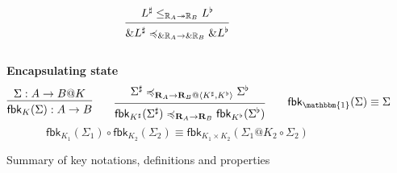 \documentclass[acmsmall,screen,review,anonymous]{acmart}
\newcommand{\kw}[1]{\ensuremath{ \mathsf{#1} }}
\renewcommand{\preceq}{\preccurlyeq}
\begin{document}
\begin{figure}
\[\begin{prooftree}
      \hypo{L^\sharp
        \le_{\mathbb{R}_A \twoheadrightarrow \mathbb{R}_B}
        L^\flat}
      \infer1{\&L^\sharp
        \preceq_{\&\mathbb{R}_A \rightarrow \&\mathbb{R}_B}
        \&L^\flat}
    \end{prooftree}
  \]
  \\[1em]
  \textbf{Encapsulating state}
  \[
    \begin{prooftree}
      \hypo{\Sigma : A \rightarrow B@K}
      \infer1{\kw{fbk}_K(\Sigma) : A \rightarrow B}
    \end{prooftree}
    \qquad
    \begin{prooftree}
      \hypo{\Sigma^\sharp
        \preceq_{\mathbf{R}_A \rightarrow
                 \mathbf{R}_B@\langle K^\sharp,K^\flat \rangle}
        \Sigma^\flat}
      \infer1{\kw{fbk}_{K^\sharp}(\Sigma^\sharp)
        \preceq_{\mathbf{R}_A \rightarrow \mathbf{R}_B}
        \kw{fbk}_{K^\flat}(\Sigma^\flat)}
    \end{prooftree}
    \qquad
    \kw{fbk}_\mathbbm{1}(\Sigma) \equiv \Sigma
  \]
  \vspace{1ex}
  \[
    \kw{fbk}_{K_1}(\Sigma_1) \circ \kw{fbk}_{K_2}(\Sigma_2) \equiv
    \kw{fbk}_{K_1 \times K_2}(\Sigma_1@K_2 \circ \Sigma_2)
  \]
  \caption{Summary of key notations, definitions and properties}
  \label{fig:overview}
\end{figure}
\end{document}
